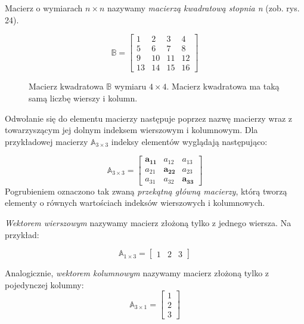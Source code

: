 Macierz o wymiarach $n \times n$ nazywamy \textit{macierzą kwadratową stopnia n} (zob. rys. 24).

\begin{figure}[H]
\begin{equation*}
\mathbb{B} =
    \begin{bmatrix}
    1 & 2 & 3 & 4 \\
    5 & 6 & 7 & 8 \\
    9 & 10 & 11 & 12 \\
    13 & 14 & 15 & 16
    \end{bmatrix}
\end{equation*}
\centering
\caption{Macierz kwadratowa $\mathbb{B}$ wymiaru $4 \times 4$. Macierz kwadratowa ma taką samą liczbę wierszy i kolumn.}
\end{figure}

Odwołanie się do elementu macierzy następuje poprzez nazwę macierzy wraz z towarzyszącym jej dolnym indeksem wierszowym i kolumnowym. Dla przykładowej macierzy $\mathbb{A}_{3\times3}$ indeksy elementów wyglądają następująco:

\begin{equation*}
\mathbb{A}_{3\times3} =
    \begin{bmatrix}
    \mathbf{a_{11}} & a_{12} & a_{13} \\
    a_{21} & \mathbf{a_{22}} & a_{23} \\
    a_{31} & a_{32} & \mathbf{a_{33}}
    \end{bmatrix}
\end{equation*}
Pogrubieniem oznaczono tak zwaną \textit{przekątną główną macierzy}, którą tworzą elementy o równych wartościach indeksów wierszowych i kolumnowych.

\textit{Wektorem wierszowym} nazywamy macierz złożoną tylko z jednego wiersza. Na przykład:

\begin{equation*}
    \mathbb{A}_{1\times3} =
    \begin{bmatrix}
   1 & 2 & 3
    \end{bmatrix}
\end{equation*}

Analogicznie, \textit{wektorem kolumnowym} nazywamy macierz złożoną tylko  z pojedynczej kolumny:
\begin{equation*}
    \mathbb{A}_{3\times1} =
    \begin{bmatrix}
    1 \\ 2 \\ 3
    \end{bmatrix}
\end{equation*}

